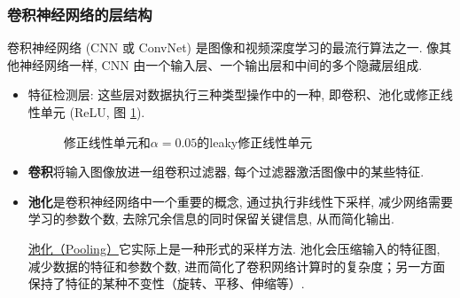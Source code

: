 \subsubsection{卷积神经网络的层结构}
卷积神经网络 (CNN 或 ConvNet) 是图像和视频深度学习的最流行算法之一.
像其他神经网络一样, CNN 由一个输入层、一个输出层和中间的多个隐藏层组成.
\begin{itemize}
    \item 特征检测层: 这些层对数据执行三种类型操作中的一种, 即卷积、池化或修正线性单元 (ReLU, 图 \ref{ReLU20200203001}).
    \begin{figure}[H]
    \begin{center}
    \end{center}
    \caption{修正线性单元和$\alpha=0.05$的leaky修正线性单元}
    \label{ReLU20200203001}
    \end{figure}
    \item \textbf{卷积}将输入图像放进一组卷积过滤器, 每个过滤器激活图像中的某些特征.
    \item \textbf{池化}是卷积神经网络中一个重要的概念, 通过执行非线性下采样, 减少网络需要学习的参数个数, 去除冗余信息的同时保留关键信息, 从而简化输出.

     \href{https://blog.csdn.net/tianwenbo6666/article/details/104349425}{池化（Pooling）}它实际上是一种形式的采样方法. 
    池化会压缩输入的特征图, 减少数据的特征和参数个数, 进而简化了卷积网络计算时的复杂度；另一方面保持了特征的某种不变性（旋转、平移、伸缩等）.


\end{itemize}
